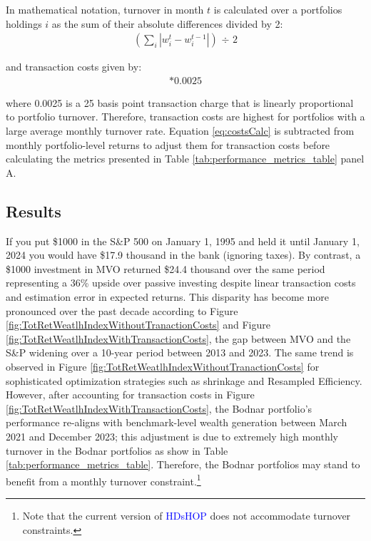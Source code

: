 \documentclass[12pt,letterpaper]{article}
\begin{document}
\clearpage

In mathematical notation, turnover in month $t$ is calculated over a portfolios holdings $i$ as the sum of their absolute differences divided by 2:
\begin{align}
(\sum_{i} | w_i^{t} - w_i^{t-1} |) \text{ ÷ } 2
\label{eq:turnoverCalc}
\end{align}

and transaction costs given by:
\begin{align}
[(\sum_{i} | w_i^{t} - w_i^{t-1} |) \text{ ÷ } 2]*0.0025
\label{eq:costsCalc}
\end{align}

where 0.0025 is a 25 basis point transaction charge that is linearly proportional to portfolio turnover. Therefore, transaction costs are highest for portfolios with a large average monthly turnover rate. Equation \ref{eq:costsCalc} is subtracted from monthly portfolio-level returns to adjust them for transaction costs before calculating the metrics presented in Table \ref{tab:performance_metrics_table} panel A.

\subsection{Results}

If you put \$1000 in the S\&P 500 on January 1, 1995 and held it until January 1, 2024 you would have \$17.9 thousand in the bank (ignoring taxes). By contrast, a \$1000 investment in MVO returned \$24.4 thousand over the same period representing a 36\% upside over passive investing despite linear transaction costs and estimation error in expected returns. This disparity has become more pronounced over the past decade according to Figure \ref{fig:TotRetWeatlhIndexWithoutTranactionCosts} and Figure \ref{fig:TotRetWeatlhIndexWithTransactionCosts}, the gap between MVO and the S\&P widening over a 10-year period between 2013 and 2023. The same trend is observed in Figure \ref{fig:TotRetWeatlhIndexWithoutTranactionCosts} for sophisticated optimization strategies such as shrinkage and Resampled Efficiency. However, after accounting for transaction costs in Figure \ref{fig:TotRetWeatlhIndexWithTransactionCosts}, the Bodnar portfolio's performance re-aligns with benchmark-level wealth generation between March 2021 and December 2023; this adjustment is due to extremely high monthly turnover in the Bodnar portfolios as show in Table \ref{tab:performance_metrics_table}. Therefore, the Bodnar portfolios may stand to benefit from a monthly turnover constraint.\footnote{Note that the current version of \textcolor{blue}{HDsHOP} does not accommodate turnover constraints.}
\end{document}
